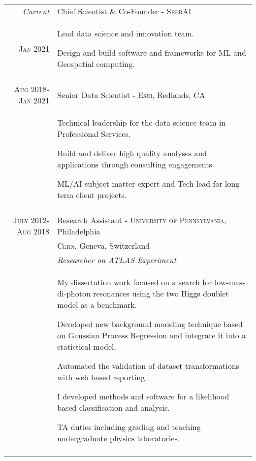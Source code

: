 \documentclass[a4paper,10pt]{article} %
\begin{document}
\begin{longtable}{r|p{11cm}}

\emph{Current}    & Chief Scientist \& Co-Founder - \textsc{SeerAI} \\
\textsc{Jan 2021} 
                & \begin{itemize}
					 \footnotesize{
						\item Lead data science and innovation team.
                        \item Design and build software and frameworks for ML and Geospatial computing.
					 }
					 \end{itemize} \\
\multicolumn{2}{c}{} \\
\textsc{Aug 2018-Jan 2021}  & Senior Data Scientist - \textsc{Esri}, Redlands, CA \\
				   & \begin{itemize}
					 \footnotesize{
						\item Technical leadership for the data science team in Professional Services.
                        \item Build and deliver high quality analyses and applications through consulting engagements
                        \item ML/AI subject matter expert and Tech lead for long term client projects.
					 }
					 \end{itemize} \\
\multicolumn{2}{c}{} \\


\textsc{July 2012-Aug 2018} & Research Assistant - \textsc{University of Pennsylvania}, Philadelphia  \\
          & \textsc{Cern}, Geneva, Switzerland \\
\textsc{} & \emph{Researcher on ATLAS Experiment}\\
				   & \begin{itemize}
					 \footnotesize{
						\item My dissertation work focused on a search for low-mass di-photon resonances using the two Higgs doublet model as a benchmark.
            \item Developed new background modeling technique based on Gaussian Process Regression and integrate it into a statistical model.
            \item Automated the validation of dataset transformations with web based reporting.
						\item I developed methods and software for a likelihood based classification and analysis.
						\item TA duties including grading and teaching undergraduate physics laboratories.
					 }
					 \end{itemize} \\
\multicolumn{2}{c}{} \\


\end{longtable}
\end{document}
